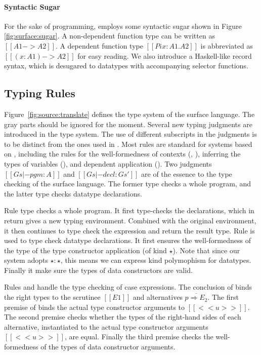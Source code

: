 \paragraph{Syntactic Sugar}
For the sake of programming, \sufcc employs some syntactic sugar
shown in Figure \ref{fig:surface:sugar}. A
non-dependent function type can be written as $[[A1 -> A2]]$. A
dependent function type $[[Pi x : A1 . A2]]$ is abbreviated as
$[[(x : A1) -> A2]]$ for easy reading. We also introduce a
Haskell-like record syntax, which is desugared to datatypes with
accompanying selector functions.


\subsection{Typing Rules}
Figure~\ref{fig:source:translate} defines the type system of the
surface language. The gray parts should be ignored for the moment. Several new
typing judgments are introduced in the type system. The use of
different subscripts in the judgments is to be distinct from the ones
used in \name. Most rules are standard for systems based on \coc,
including the rules for the well-formedness of contexts
(, ), inferring the types of
variables (), and dependent application
(). Two judgments $[[Gs |- pgm : A]]$ and
$[[Gs |- decl : Gs']]$ are of the essence to the type checking of the
surface language. The former type checks a whole program, and the
latter type checks datatype declarations.

Rule  type checks a whole program. It first
type-checks the declarations, which in return gives a new typing
environment. Combined with the original environment, it then continues
to type check the expression and return the result type. Rule
 is used to type check datatype declarations. It
first ensures the well-formedness of the type of the type constructor
application (of kind $\star$). Note that since our system adopts
$\star : \star$, this means we can express kind polymophism for
datatypes. Finally it make sure the types of data constructors are
valid.

Rules  and  handle the type
checking of case expressions. The conclusion of 
binds the right types to the scrutinee $[[E1]]$ and alternatives
$\overline{p \Rightarrow E_2}$. The first premise of
 binds the actual type constructor arguments to
$[[<<u>>]]$. The second premise checks whether the types of the
right-hand sides of each alternative, instantiated to the actual type
constructor arguments $[[<<u>>]]$, are equal. Finally the third
premise checks the well-formedness of the types of data constructor
arguments.

